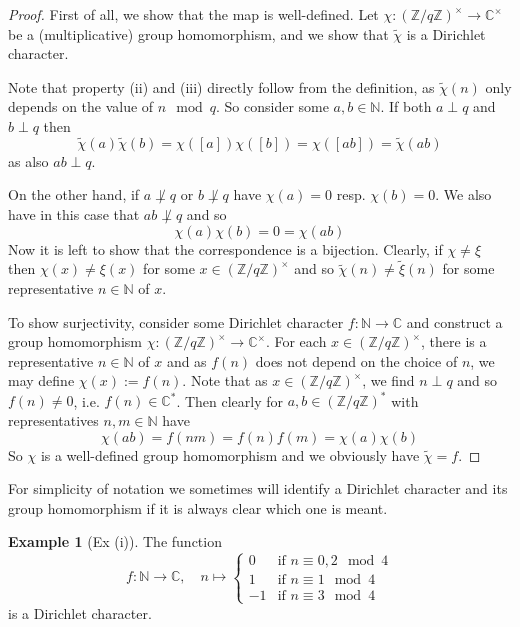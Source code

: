 \documentclass{scrartcl}
\newcommand{\N}{\mathbb{N}}
\newcommand{\Z}{\mathbb{Z}}
\newcommand{\C}{\mathbb{C}}
\newcommand{\units}{\times}
\theoremstyle{definition}
\newtheorem{example}[definition]{Example}
\begin{document}
\begin{proof}
    First of all, we show that the map is well-defined. Let $\chi: (\Z/q\Z)^\units \to \C^\units$ be a (multiplicative) group homomorphism, and we show that $\tilde{\chi}$ is a Dirichlet character.
    
    Note that property (ii) and (iii) directly follow from the definition, as $\tilde{\chi}(n)$ only depends on the value of $n \mod q$.
    So consider some $a, b \in \N$.
    If both $a \perp q$ and $b \perp q$ then
    \begin{equation*}
        \tilde{\chi}(a)\tilde{\chi}(b) = \chi([a])\chi([b]) = \chi([ab]) = \tilde{\chi}(ab)
    \end{equation*}
    as also $ab \perp q$.

    On the other hand, if $a \not\perp q$ or $b \not\perp q$ have $\chi(a) = 0$ resp. $\chi(b) = 0$.
    We also have in this case that $ab \not\perp q$ and so
    \begin{equation*}
        \chi(a)\chi(b) = 0 = \chi(ab)
    \end{equation*}
    Now it is left to show that the correspondence is a bijection.
    Clearly, if $\chi \neq \xi$ then $\chi(x) \neq \xi(x)$ for some $x \in (\Z/q\Z)^\units$ and so $\tilde{\chi}(n) \neq \tilde{\xi}(n)$ for some representative $n \in \N$ of $x$.
    
    To show surjectivity, consider some Dirichlet character $f: \N \to \C$ and construct a group homomorphism $\chi: (\Z/q\Z)^\units \to \C^\units$. 
    For each $x \in (\Z/q\Z)^\units$, there is a representative $n \in \N$ of $x$ and as $f(n)$ does not depend on the choice of $n$, we may define $\chi(x) := f(n)$.
    Note that as $x \in (\Z/q\Z)^\units$, we find $n \perp q$ and so $f(n) \neq 0$, i.e. $f(n) \in \C^*$.
    Then clearly for $a, b \in (\Z/q\Z)^*$ with representatives $n, m \in \N$ have
    \begin{equation*}
        \chi(ab) = f(nm) = f(n)f(m) = \chi(a)\chi(b)
    \end{equation*}
    So $\chi$ is a well-defined group homomorphism and we obviously have $\tilde{\chi} = f$.
\end{proof}
For simplicity of notation we sometimes will identify a Dirichlet character and its group homomorphism if it is always clear which one is meant.
\begin{example}[Ex (i)]
    \label{ex:nontrivial_dirichlet_character_mod_4}
    The function
    \begin{equation*}
        f: \N \to \C, \quad n \mapsto \begin{cases}
            0 & \text{if $n \equiv 0, 2 \mod 4$} \\
            1 & \text{if $n \equiv 1 \mod 4$} \\
            -1 & \text{if $n \equiv 3 \mod 4$}
        \end{cases}
    \end{equation*}
    is a Dirichlet character.
\end{example}
\end{document}
